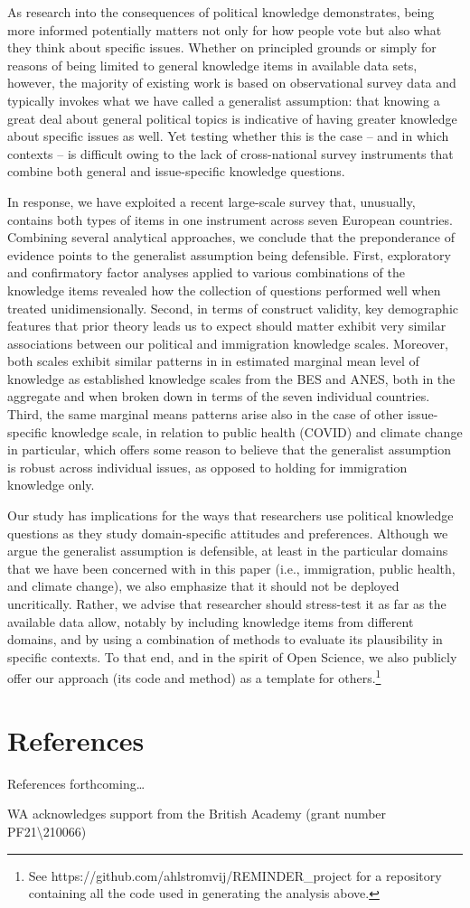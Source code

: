 \documentclass[11pt,halfline,a4paper,]{ouparticle}
\begin{document}
As research into the consequences of political knowledge demonstrates,
being more informed potentially matters not only for how people vote but
also what they think about specific issues. Whether on principled
grounds or simply for reasons of being limited to general knowledge
items in available data sets, however, the majority of existing work is
based on observational survey data and typically invokes what we have
called a generalist assumption: that knowing a great deal about general
political topics is indicative of having greater knowledge about
specific issues as well. Yet testing whether this is the case -- and in
which contexts -- is difficult owing to the lack of cross-national
survey instruments that combine both general and issue-specific
knowledge questions.

In response, we have exploited a recent large-scale survey that,
unusually, contains both types of items in one instrument across seven
European countries. Combining several analytical approaches, we conclude
that the preponderance of evidence points to the generalist assumption
being defensible. First, exploratory and confirmatory factor analyses
applied to various combinations of the knowledge items revealed how the
collection of questions performed well when treated unidimensionally.
Second, in terms of construct validity, key demographic features that
prior theory leads us to expect should matter exhibit very similar
associations between our political and immigration knowledge scales.
Moreover, both scales exhibit similar patterns in in estimated marginal
mean level of knowledge as established knowledge scales from the BES and
ANES, both in the aggregate and when broken down in terms of the seven
individual countries. Third, the same marginal means patterns arise also
in the case of other issue-specific knowledge scale, in relation to
public health (COVID) and climate change in particular, which offers
some reason to believe that the generalist assumption is robust across
individual issues, as opposed to holding for immigration knowledge only.

Our study has implications for the ways that researchers use political
knowledge questions as they study domain-specific attitudes and
preferences. Although we argue the generalist assumption is defensible,
at least in the particular domains that we have been concerned with in
this paper (i.e., immigration, public health, and climate change), we
also emphasize that it should not be deployed uncritically. Rather, we
advise that researcher should stress-test it as far as the available
data allow, notably by including knowledge items from different domains,
and by using a combination of methods to evaluate its plausibility in
specific contexts. To that end, and in the spirit of Open Science, we
also publicly offer our approach (its code and method) as a template for
others.\footnote{See https://github.com/ahlstromvij/REMINDER\_project
  for a repository containing all the code used in generating the
  analysis above.}

\hypertarget{references}{%
\section{References}\label{references}}

References forthcoming\ldots{}


\begin{notes}[Acknowledgements]
WA acknowledges support from the British Academy (grant number
PF21\textbackslash210066)
\end{notes}
\end{document}
